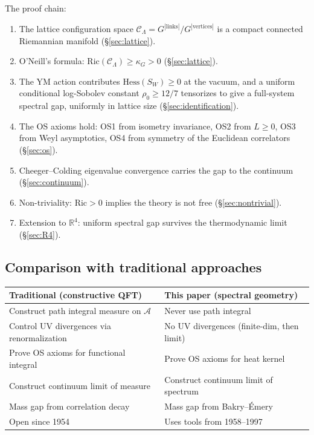 \documentclass[11pt]{article}
\theoremstyle{definition}
\newcommand{\calA}{\mathcal{A}}
\newcommand{\calC}{\mathcal{C}}
\newcommand{\Ric}{\mathrm{Ric}}
\newcommand{\Hess}{\mathrm{Hess}}
\newcommand{\R}{\mathbb{R}}
\begin{document}
The proof chain:
\begin{enumerate}
    \item The lattice configuration space $\calC_\Lambda = G^{|\text{links}|}/G^{|\text{vertices}|}$ is a compact connected Riemannian manifold (\S\ref{sec:lattice}).

    \item O'Neill's formula: $\Ric(\calC_\Lambda) \geq \kappa_G > 0$ (\S\ref{sec:lattice}).

    \item The YM action contributes $\Hess(S_W) \geq 0$ at the vacuum, and a uniform conditional log-Sobolev constant $\rho_0 \geq 12/7$ tensorizes to give a full-system spectral gap, uniformly in lattice size (\S\ref{sec:identification}).

    \item The OS axioms hold: OS1 from isometry invariance, OS2 from $L \geq 0$, OS3 from Weyl asymptotics, OS4 from symmetry of the Euclidean correlators (\S\ref{sec:os}).

    \item Cheeger--Colding eigenvalue convergence carries the gap to the continuum (\S\ref{sec:continuum}).

    \item Non-triviality: $\Ric > 0$ implies the theory is not free (\S\ref{sec:nontrivial}).

    \item Extension to $\R^4$: uniform spectral gap survives the thermodynamic limit (\S\ref{sec:R4}).
\end{enumerate}

\subsection{Comparison with traditional approaches}

\begin{center}
\renewcommand{\arraystretch}{1.3}
\begin{tabular}{@{} p{5.5cm} p{5.5cm} @{}}
\hline
\textbf{Traditional (constructive QFT)} & \textbf{This paper (spectral geometry)} \\
\hline
Construct path integral measure on $\calA$ &
    Never use path integral \\
Control UV divergences via renormalization &
    No UV divergences (finite-dim, then limit) \\
Prove OS axioms for functional integral &
    Prove OS axioms for heat kernel \\
Construct continuum limit of measure &
    Construct continuum limit of spectrum \\
Mass gap from correlation decay &
    Mass gap from Bakry--\'Emery \\
Open since 1954 &
    Uses tools from 1958--1997 \\
\hline
\end{tabular}
\end{center}
\end{document}
